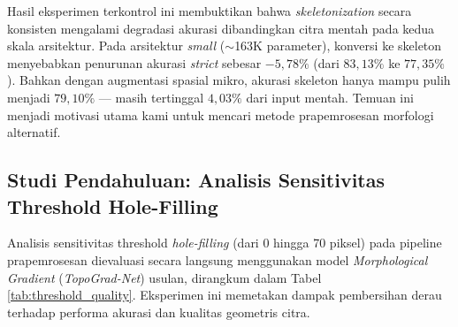\documentclass[journal]{IEEEtran}
\begin{document}
Hasil eksperimen terkontrol ini membuktikan bahwa \textit{skeletonization} secara konsisten mengalami degradasi akurasi dibandingkan citra mentah pada kedua skala arsitektur. Pada arsitektur \textit{small} ($\sim$163K parameter), konversi ke skeleton menyebabkan penurunan akurasi \textit{strict} sebesar $-5{,}78\%$ (dari $83{,}13\%$ ke $77{,}35\%$). Bahkan dengan augmentasi spasial mikro, akurasi skeleton hanya mampu pulih menjadi $79{,}10\%$ --- masih tertinggal $4{,}03\%$ dari input mentah. Temuan ini menjadi motivasi utama kami untuk mencari metode prapemrosesan morfologi alternatif.

\subsection{Studi Pendahuluan: Analisis Sensitivitas Threshold Hole-Filling}
\label{sec:threshold}
Analisis sensitivitas threshold \textit{hole-filling} (dari 0 hingga 70 piksel) pada pipeline prapemrosesan dievaluasi secara langsung menggunakan model \textit{Morphological Gradient} (\textit{TopoGrad-Net}) usulan, dirangkum dalam Tabel \ref{tab:threshold_quality}. Eksperimen ini memetakan dampak pembersihan derau terhadap performa akurasi dan kualitas geometris citra.

\begin{table}[t]
\caption{Analisis Sensitivitas Threshold Hole-Filling Terhadap Akurasi dan Kualitas Geometris}
\label{tab:threshold_quality}
\begin{center}
\footnotesize
{}
\end{center}
\end{table}
\end{document}

